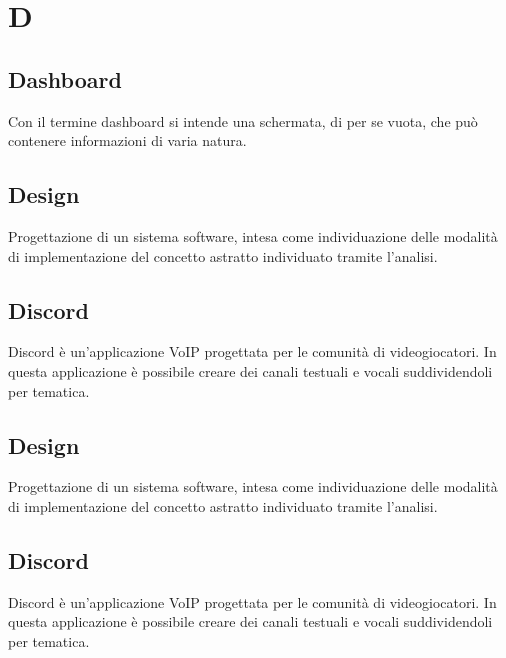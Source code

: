 \section{D}
	\subsection{Dashboard}  
		Con il termine dashboard si intende una schermata, di per se vuota, che può contenere informazioni di varia natura.
	\subsection{Design}  
		Progettazione di un sistema software, intesa come individuazione delle modalità di implementazione del concetto astratto individuato tramite l'analisi.
	\subsection{Discord}  
		Discord è un'applicazione VoIP progettata per le comunità di videogiocatori. In questa applicazione è possibile creare dei canali testuali e vocali suddividendoli per tematica. 
	\subsection{Design}  
		Progettazione di un sistema software, intesa come individuazione delle modalità di implementazione del concetto astratto individuato tramite l'analisi.
	\subsection{Discord}  
		Discord è un'applicazione VoIP progettata per le comunità di videogiocatori. In questa applicazione è possibile creare dei canali testuali e vocali suddividendoli per tematica. 


\newpage